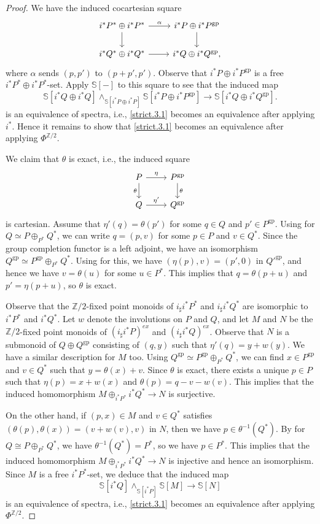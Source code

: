 \documentclass[10pt]{amsart}
\theoremstyle{definition}
\theoremstyle{remark}
\numberwithin{equation}{section}
\newcommand{\Sphere}{\mathbb{S}}
\newcommand{\Z}{\mathbb{Z}}
\newcommand{\gp}{\mathrm{gp}}
\newcommand{\Ztwo}{{\mathbb{Z}/2}}
\begin{document}
\begin{proof}
We have the induced cocartesian square
\begin{equation}
\label{strict.3.2}
\begin{tikzcd}
i^*P^*\oplus i^*P^*\ar[r,"\alpha"]\ar[d]&
i^*P\oplus i^*P^\gp\ar[d]
\\
i^*Q^*\oplus i^*Q^*\ar[r]&
i^*Q\oplus i^*Q^\gp,
\end{tikzcd}
\end{equation}
where $\alpha$ sends $(p,p')$ to $(p+p',p')$.
Observe that $i^*P\oplus i^*P^\gp$ is a free $i^*P^*\oplus i^*P^*$-set.
Apply $\Sphere[-]$ to this square to see that the induced map
\[
\Sphere[i^*Q \oplus i^*Q]
\wedge_{\Sphere[i^*P\oplus i^*P]}
\Sphere[i^*P\oplus i^*P^\gp]
\to
\Sphere[i^*Q\oplus i^*Q^\gp].
\]
is an equivalence of spectra,
i.e.,
\eqref{strict.3.1} becomes an equivalence after applying $i^*$.
Hence it remains to show that \eqref{strict.3.1} becomes an equivalence after applying $\Phi^{\Z/2}$.

We claim that $\theta$ is exact,
i.e.,
the induced square
\[
\begin{tikzcd}
P\ar[d,"\theta"']\ar[r,"\eta"]&
P^\gp\ar[d,"\theta"]
\\
Q\ar[r,"\eta'"]&
Q^\gp
\end{tikzcd}
\]
is cartesian.
Assume that $\eta'(q)=\theta(p')$ for some $q\in Q$ and $p'\in P^\gp$.
Using \cite[Proposition I.1.1.5(3)]{Ogu} for $Q\simeq P\oplus_{P^*}Q^*$,
we can write $q=(p,v)$ for some $p\in P$ and $v\in Q^*$.
Since the group completion functor is a left adjoint,
we have an isomorphism $Q^\gp \simeq P^\gp\oplus_{P^*}Q^*$.
Using \cite[Proposition I.1.1.5(3)]{Ogu} for this,
we have $(\eta(p),v)=(p',0)$ in $Q'^\gp$,
and hence we have $v=\theta(u)$ for some $u\in P^*$.
This implies that $q=\theta(p+u)$ and $p'=\eta(p+u)$,
so $\theta$ is exact.

Observe that the $\Ztwo$-fixed point monoids of $i_\sharp i^* P^*$ and $i_\sharp i^*Q^*$ are isomorphic to $i^*P^*$ and $i^*Q^*$.
Let $w$ denote the involutions on $P$ and $Q$,
and let $M$ and $N$ be the $\Ztwo$-fixed point monoids of $(i_\sharp i^*P)^{ex}$ and $(i_\sharp i^*Q)^{ex}$.
Observe that $N$ is a submonoid of $Q\oplus Q^\gp$ consisting of $(q,y)$ such that $\eta'(q)=y+w(y)$.
We have a similar description for $M$ too.
Using $Q^\gp \simeq P^\gp\oplus_{P^*}Q^*$,
we can find $x\in P^\gp$ and $v\in Q^*$ such that $y=\theta(x)+v$.
Since $\theta$ is exact,
there exists a unique $p\in P$ such that $\eta(p)=x+w(x)$ and $\theta(p)=q-v-w(v)$.
This implies that the induced homomorphism $M\oplus_{i^*P^*}i^*Q^*\to N$ is surjective.

On the other hand,
if $(p,x)\in M$ and $v\in Q^*$ satisfies $(\theta(p),\theta(x))=(v+w(v),v)$ in $N$,
then we have $p\in \theta^{-1}(Q^*)$.
By \cite[Proposition I.1.1.5(3)]{Ogu} for $Q\cong P\oplus_{P^*}Q^*$,
we have $\theta^{-1}(Q^*)=P^*$, so we have $p\in P^*$.
This implies that the induced homomorphism $M\oplus_{i^*P^*}i^*Q^*\to N$ is injective and hence an isomorphism.
Since $M$ is a free $i^*P^*$-set,
we deduce that the induced map
\[
\Sphere[i^*Q]\wedge_{\Sphere[i^*P]}\Sphere[M]
\to
\Sphere[N]
\]
is an equivalence of spectra,
i.e.,
\eqref{strict.3.1} becomes an equivalence after applying $\Phi^{\Ztwo}$.
\end{proof}
\end{document}
